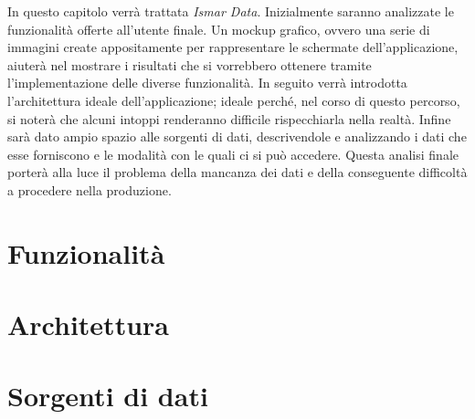 \documentclass[./main.tex]{subfiles}
\begin{document}
In questo capitolo verrà trattata \textit{Ismar Data}. Inizialmente saranno analizzate le funzionalità offerte all'utente finale. Un mockup grafico, ovvero una serie di immagini create appositamente per rappresentare le schermate dell'applicazione, aiuterà nel mostrare i risultati che si vorrebbero ottenere tramite l'implementazione delle diverse funzionalità. In seguito verrà introdotta l'architettura ideale dell'applicazione; ideale perché, nel corso di questo percorso, si noterà che alcuni intoppi renderanno difficile rispecchiarla nella realtà. Infine sarà dato ampio spazio alle sorgenti di dati, descrivendole e analizzando i dati che esse forniscono e le modalità con le quali ci si può accedere. Questa analisi finale porterà alla luce il problema della mancanza dei dati e della conseguente difficoltà a procedere nella produzione.

\section{Funzionalità}


\section{Architettura}


\section{Sorgenti di dati}

\end{document}

